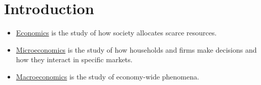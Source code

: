 \setcounter{chapter}{-1}
\chapter{Introduction}

\begin{itemize}
	
	\item \underline{Economics} is the study of how society allocates scarce resources.

	\item \underline{Microeconomics} is the study of how households and firms make decisions and how they interact in specific markets.

	\item \underline{Macroeconomics} is the study of economy-wide phenomena.
	
\end{itemize}

\renewcommand{\chaptername}{Chapter}